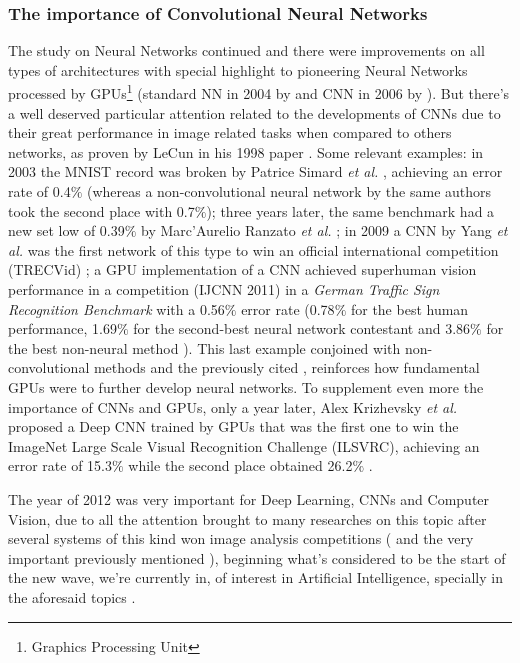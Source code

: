 \documentclass[a4paper, 12pt]{report}
\begin{document}
\subsubsection{The importance of Convolutional Neural Networks}
The study on Neural Networks continued and there were improvements on all types of architectures \autocite{hochreiterLongShortTermMemory1997,wengCresceptronSelforganizingNeural1992} with special highlight to pioneering Neural Networks processed by GPUs\footnote{Graphics Processing Unit} (standard NN in 2004 by \autocite{ohGPUImplementationNeural2004} and CNN in 2006 by \autocite{chellapillaHighPerformanceConvolutional}). But there's a well deserved particular attention related to the developments of CNNs due to their great performance in image related tasks when compared to others networks, as proven by LeCun in his 1998 paper \autocite{lecunGradientBasedLearningApplied1998}. Some relevant examples: in 2003 the MNIST record was broken by Patrice Simard \textit{et al.} \autocite{simardBestPracticesConvolutional2003}, achieving an error rate of 0.4$\%$ (whereas a non-convolutional neural network by the same authors took the second place with 0.7$\%$); three years later, the same benchmark had a new set low of 0.39$\%$ by Marc’Aurelio Ranzato \textit{et al.} \autocite{ranzatoEfficientLearningSparse2006}; in 2009 a CNN by Yang \textit{et al.} was the first network of this type to win an official international competition (TRECVid) \autocite{Yang2009}; a GPU implementation of a CNN \autocite{ciresanCommitteeNeuralNetworks2011} achieved superhuman vision performance in a competition (IJCNN 2011) in a \textit{German Traffic Sign Recognition Benchmark} with a 0.56$\%$ error rate (0.78$\%$ for the best human performance, 1.69$\%$ for the second-best neural network contestant and 3.86$\%$ for the best non-neural method \autocite{stallkampManVsComputer2012}). This last example conjoined with non-convolutional methods \autocite{rainaLargescaleDeepUnsupervised2009b,ciresanDeepBigSimple2010} and the previously cited \autocite{chellapillaHighPerformanceConvolutional,ohGPUImplementationNeural2004}, reinforces how fundamental GPUs were to further develop neural networks. To supplement even more the importance of CNNs and GPUs, only a year later, Alex Krizhevsky \textit{et al.} proposed a Deep CNN trained by GPUs that was the first one to win the ImageNet Large Scale Visual Recognition Challenge (ILSVRC), achieving an error rate of 15.3$\%$ while the second place obtained 26.2$\%$ \autocite{krizhevskyImageNetClassificationDeep2012}. 
\par The year of 2012 was very important for Deep Learning, CNNs and Computer Vision, due to all the attention brought to many researches on this topic after several systems of this kind won image analysis competitions (\autocite{ciresanDeepNeuralNetworks2012,ciresanMitosisDetectionBreast2013} and the very important previously mentioned \autocite{krizhevskyImageNetClassificationDeep2012}), beginning what's considered to be the start of the new wave, we're currently in, of interest in Artificial Intelligence, specially in the aforesaid topics \autocite{liSurveyConvolutionalNeural2020}. 
\end{document}
